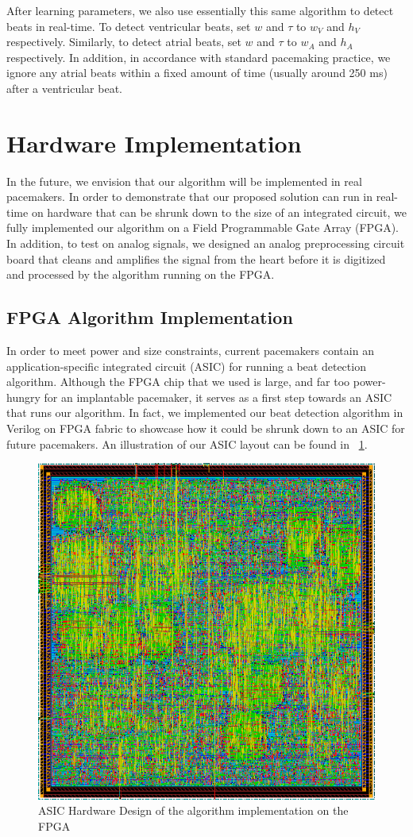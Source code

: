 \documentclass[conference]{IEEEtran}
\newcommand{\APW}{\ensuremath{w_A}}
\newcommand{\VPW}{\ensuremath{w_V}}
\newcommand{\APH}{\ensuremath{h_A}}
\newcommand{\VPH}{\ensuremath{h_V}}
\begin{document}
After learning parameters, we also use essentially this same algorithm to detect beats in real-time.
To detect ventricular beats, set $w$ and $\tau$ to \VPW{} and \VPH{} respectively.
Similarly, to detect atrial beats, set $w$ and $\tau$ to \APW{} and \APH{} respectively.
In addition, in accordance with standard pacemaking practice, we ignore any atrial beats within a fixed amount of time (usually around 250 ms) after
a ventricular beat.

\section{Hardware Implementation}
In the future, we envision that our algorithm will be
implemented in real pacemakers. In order to
demonstrate that our proposed solution can run in
real-time on hardware that can be shrunk down to
the size of an integrated circuit, we fully implemented
our algorithm on a Field Programmable Gate Array
(FPGA).
In addition, to test on analog signals, we
designed an analog preprocessing circuit board that cleans and
amplifies the signal from the heart before it is digitized and processed
by the algorithm running on the FPGA.

\subsection{FPGA Algorithm Implementation}
In order to meet power and size constraints, 
current pacemakers contain an application-specific integrated circuit (ASIC) for running a beat detection algorithm.
Although the FPGA chip that we used is large, and far too power-hungry for an implantable pacemaker,
it serves as a first step towards an ASIC that runs our algorithm.
In fact, we implemented our beat detection algorithm in Verilog on FPGA fabric to
showcase how it could be shrunk down to an ASIC for future pacemakers.
An illustration of our ASIC
layout can be found in \figurename~\ref{fig:fpga}.
\begin{figure}[h]
	\centering
	\includegraphics[width=.7\columnwidth]{fpga.png}
	\caption{ASIC Hardware Design of the algorithm implementation on the FPGA}
	\label{fig:fpga}
\end{figure}
\end{document}
